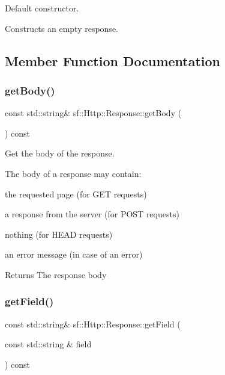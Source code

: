 Default constructor. 

Constructs an empty response. 

\subsection{Member Function Documentation}
\mbox{\label{classsf_1_1_http_1_1_response_ab3bfc29867563aa815f6460eeea16136}} 
\subsubsection{\texorpdfstring{get\+Body()}{getBody()}}
{\footnotesize\ttfamily const std\+::string\& sf\+::\+Http\+::\+Response\+::get\+Body (\begin{DoxyParamCaption}{ }\end{DoxyParamCaption}) const}



Get the body of the response. 

The body of a response may contain\+: \begin{DoxyItemize}
\item the requested page (for G\+ET requests) \item a response from the server (for P\+O\+ST requests) \item nothing (for H\+E\+AD requests) \item an error message (in case of an error)\end{DoxyItemize}
\begin{DoxyReturn}{Returns}
The response body 
\end{DoxyReturn}
\mbox{\label{classsf_1_1_http_1_1_response_a6dedeaeea13b5ebf0c41fc7a1c1885e5}} 
\subsubsection{\texorpdfstring{get\+Field()}{getField()}}
{\footnotesize\ttfamily const std\+::string\& sf\+::\+Http\+::\+Response\+::get\+Field (\begin{DoxyParamCaption}\item[{const std\+::string \&}]{field }\end{DoxyParamCaption}) const}



